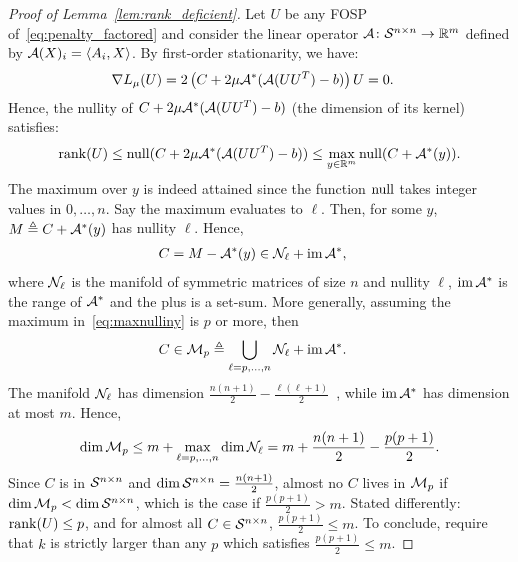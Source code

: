 \begin{proof}[Proof of Lemma~\ref{lem:rank_deficient}]
	Let $U$ be any FOSP of~\eqref{eq:penalty_factored} and consider the linear operator $\mathcal{A} \colon \mathcal{S}^{n\times n} \to \mathbb{R}^{m}$ defined by $\mathcal{A}(X)_i = \left\langle A_i, X \right\rangle$. By first-order stationarity, we have: 
	\begin{align*}
		\nabla L_\mu(U) & = 2\left( C + 2\mu \mathcal{A}^*(\mathcal{A}(UU^T) - b) \right)U = 0.
	\end{align*}
	Hence, the nullity of $C + 2\mu \mathcal{A}^*(\mathcal{A}(UU^T) - b)$ (the dimension of its kernel) satisfies:
	\begin{align}
		\operatorname{rank}(U) \leq \operatorname{null}(C + 2\mu \mathcal{A}^*(\mathcal{A}(UU^T) - b)) \leq \max_{y \in \mathbb{R}^{m}} \operatorname{null}(C + \mathcal{A}^*(y)).
		\label{eq:maxnulliny}
	\end{align}
	The maximum over $y$ is indeed attained since the function $\operatorname{null}$ takes integer values in $0, \ldots, n$. Say the maximum evaluates to $\ell$. Then, for some $y$, $M \triangleq C + \mathcal{A}^*(y)$ has nullity $\ell$. Hence,
	\begin{align*}
		C & = M - \mathcal{A}^*(y) \in \mathcal{N}_\ell + \operatorname{im} \mathcal{A}^*,
	\end{align*}
	where $\mathcal{N}_\ell$ is the manifold of symmetric matrices of size $n$ and nullity $\ell$, $\operatorname{im} \mathcal{A}^*$ is the range of $\mathcal{A}^*$ and the plus is a set-sum. More generally, assuming the maximum in~\eqref{eq:maxnulliny} is $p$ or more, then
	\begin{align*}
		C & \in \mathcal{M}_p \triangleq \bigcup_{\ell = p, \ldots, n} \mathcal{N}_\ell + \operatorname{im} \mathcal{A}^*.
	\end{align*}
	The manifold $\mathcal{N}_\ell$ has dimension $\frac{n(n+1)}{2} - \frac{\ell(\ell+1)}{2}$~\citep[Prop.~2.1(i)]{helmke1995matrixlsq}, while $\operatorname{im} \mathcal{A}^*$ has dimension at most $m$. Hence, $$\dim \mathcal{M}_p \leq m + \max_{\ell = p, \ldots, n} \dim \mathcal{N}_\ell = m + \frac{n(n+1)}{2} - \frac{p(p+1)}{2}.$$ Since $C$ is in $\mathcal{S}^{n\times n}$ and $\dim \mathcal{S}^{n\times n} = \frac{n(n+1)}{2}$, almost no $C$ lives in $\mathcal{M}_p$ if $\dim\mathcal{M}_p < \dim \mathcal{S}^{n\times n}$, which is the case if $\frac{p(p+1)}{2} > m$. Stated differently: $\operatorname{rank}(U) \leq p$, and for almost all $C \in \mathcal{S}^{n\times n}$, $\frac{p(p+1)}{2} \leq m$. To conclude, require that $k$ is strictly larger than any $p$ which satisfies $\frac{p(p+1)}{2} \leq m$.
\end{proof}
